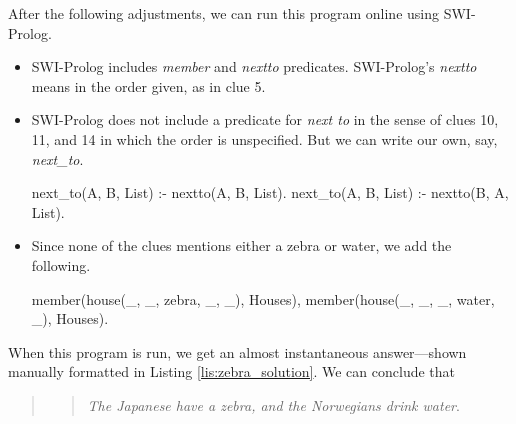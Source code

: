 \largev
After the following adjustments, we can run this program online using SWI-Prolog. 
\begin{itemize}
    \item SWI-Prolog includes \textit{member} and \textit{nextto} predicates. SWI-Prolog's \textit{nextto} means in the order given, as in clue 5.

    \item SWI-Prolog does not include a predicate for \textit{next to} in the sense of clues 10, 11, and 14 in which the order is unspecified. But we can write our own, say, \textit{next\_to}.
    
\begin{python}
next_to(A, B, List) :- nextto(A, B, List).
next_to(A, B, List) :- nextto(B, A, List).
\end{python}

    \item Since none of the clues mentions either a zebra or water, we add the following.

\begin{minipage}{\linewidth}
\begin{python}

    member(house(_, _, zebra, _, _), Houses), 
    member(house(_, _, _, water, _), Houses).
\end{python}
\end{minipage}

\end{itemize}

When this program is run, we get an almost instantaneous answer---shown manually formatted in Listing \ref{lis:zebra_solution}. We can conclude that 
\begin{quote} 
\begin{quote} 
\textit{The Japanese have a zebra, and the Norwegians drink water}.
\end{quote} 
\end{quote} 


